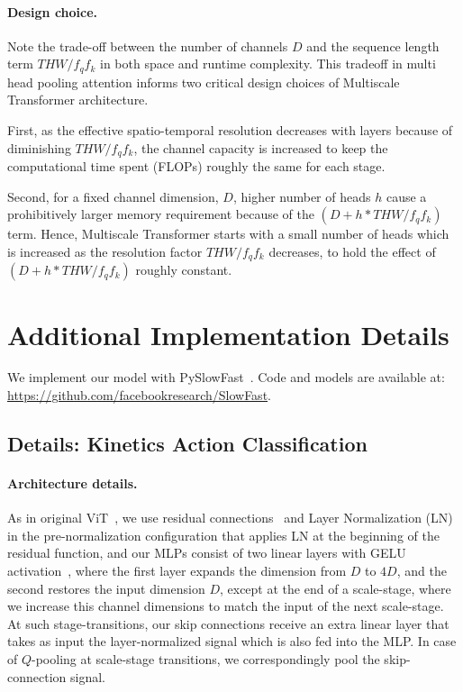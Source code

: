 \documentclass[10pt,twocolumn,letterpaper]{article}
\newcommand{\fullnameCC}{Multiscale Transformer\xspace}
\newcommand{\attnname}{multi head pooling attention\xspace}
\begin{document}
\paragraph{Design choice.} Note the trade-off between the number of channels $D$ and the sequence length term $THW/f_qf_k$ in both space and runtime complexity. This tradeoff in \attnname informs two critical design choices of \fullnameCC architecture. 

First, as the effective spatio-temporal resolution decreases with layers because of diminishing $THW/f_qf_k$, the channel capacity is increased to keep the computational time spent (FLOPs) roughly the same for each stage. 

Second, for a fixed channel dimension, $D$, higher number of heads $h$ cause a prohibitively larger memory requirement because of the $(D + h * THW/f_qf_k)$ term. Hence, \fullnameCC starts with a small number of heads which is increased as the resolution factor $THW/f_qf_k$ decreases, to hold the effect of $(D + h * THW/f_qf_k)$ roughly constant.  






\section{Additional Implementation Details} \label{sec:app_training} 

We implement our model with \mbox{PySlowFast}~\cite{fan2020pyslowfast}. Code and models are available at: \url{https://github.com/facebookresearch/SlowFast}. 

\subsection{Details: Kinetics Action Classification}\label{sec:kineticsapp}
\paragraph{Architecture details.}
As in original ViT~\cite{dosovitskiy2020image}, we use residual connections~\cite{He2016} and Layer Normalization (LN) \cite{ba2016layer} in the pre-normalization configuration that applies LN at the beginning of the residual function, and our MLPs consist of two linear layers with GELU activation~\cite{hendrycks2016gaussian}, where the first layer expands the dimension from $D$ to $4D$, and the second restores the input dimension $D$, except at the end of a scale-stage, where we increase this channel dimensions to match the input of the next scale-stage. At such stage-transitions, our skip connections receive an extra linear layer that takes as input the layer-normalized signal which is also fed into the MLP. In case of $Q$-pooling at scale-stage transitions, we correspondingly pool the skip-connection signal.
\end{document}

